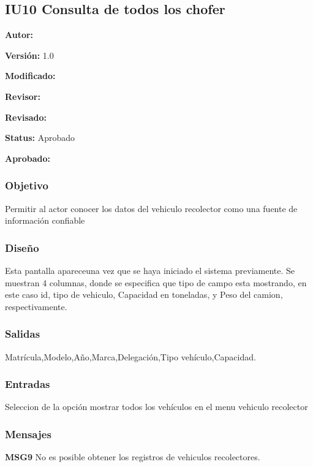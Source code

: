 \subsection{IU10 Consulta de todos los chofer}

\begin{objetivos}
	\item {\bf Autor:} 
	\item {\bf Versión:} 1.0
	\item {\bf Modificado:} 
	\item {\bf Revisor:} 
	\item {\bf Revisado:}
	\item {\bf Status:} Aprobado
	\item {\bf Aprobado:} 
\end{objetivos}

\subsubsection{Objetivo}

	Permitir al actor conocer los datos del vehiculo recolector como una fuente de información confiable

\subsubsection{Diseño}
	Esta pantalla apareceuna vez que se haya iniciado el sistema previamente.
	Se muestran 4 columnas, donde se especifica que tipo de campo esta mostrando, en este caso id, tipo de vehiculo, Capacidad en toneladas, y Peso del camion, respectivamente.
	


\subsubsection{Salidas}

Matrícula,Modelo,Año,Marca,Delegación,Tipo vehículo,Capacidad.

\subsubsection{Entradas}
Seleccion de la opción mostrar todos los vehículos en el menu vehiculo recolector



\subsubsection{Mensajes}
	\begin{Citemize}
		\item {\bf MSG9} No es posible obtener los registros de vehiculos recolectores.
	\end{Citemize}